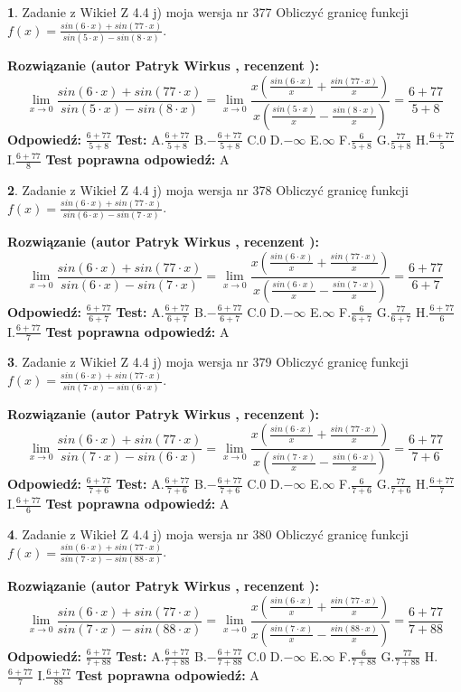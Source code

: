 \documentclass[12pt, a4paper]{article}
\theoremstyle{definition} %
\newtheorem{zad}{}
\newcommand{\zadStart}[1]{\begin{zad}#1\newline}
\newcommand{\zadStop}{\end{zad}}
\newcommand{\rozwStart}[2]{\noindent \textbf{Rozwiązanie (autor #1 , recenzent #2): }\newline}
\newcommand{\rozwStop}{\newline}
\newcommand{\odpStart}{\noindent \textbf{Odpowiedź:}\newline}
\newcommand{\odpStop}{\newline}
\newcommand{\testStart}{\noindent \textbf{Test:}\newline}
\newcommand{\testStop}{\newline}
\newcommand{\kluczStart}{\noindent \textbf{Test poprawna odpowiedź:}\newline}
\newcommand{\kluczStop}{\newline}
\begin{document}
\zadStart{Zadanie z Wikieł Z 4.4 j) moja wersja nr 377}
Obliczyć granicę funkcji $f(x)=\frac{sin(6\cdot x) +sin(77\cdot x)}{sin(5\cdot x) -sin(8\cdot x)}$.
\zadStop
\rozwStart{Patryk Wirkus}{}
$$\lim\limits_{x\to 0}\frac{sin(6\cdot x) +sin(77\cdot x)}{sin(5\cdot x) -sin(8\cdot x)}=\lim\limits_{x\to 0}\frac{x(\frac{sin(6\cdot x)}{x}+\frac{sin(77\cdot x)}{x})}{x(\frac{sin(5\cdot x)}{x}-\frac{sin(8\cdot x)}{x})}=\frac{6+77}{5+8}$$
\rozwStop
\odpStart
$\frac{6+77}{5+8}$
\odpStop
\testStart
A.$\frac{6+77}{5+8}$
B.$-\frac{6+77}{5+8}$
C.$0$
D.$-\infty$
E.$\infty$
F.$\frac{6}{5+8}$
G.$\frac{77}{5+8}$
H.$\frac{6+77}{5}$
I.$\frac{6+77}{8}$
\testStop
\kluczStart
A
\kluczStop



\zadStart{Zadanie z Wikieł Z 4.4 j) moja wersja nr 378}
Obliczyć granicę funkcji $f(x)=\frac{sin(6\cdot x) +sin(77\cdot x)}{sin(6\cdot x) -sin(7\cdot x)}$.
\zadStop
\rozwStart{Patryk Wirkus}{}
$$\lim\limits_{x\to 0}\frac{sin(6\cdot x) +sin(77\cdot x)}{sin(6\cdot x) -sin(7\cdot x)}=\lim\limits_{x\to 0}\frac{x(\frac{sin(6\cdot x)}{x}+\frac{sin(77\cdot x)}{x})}{x(\frac{sin(6\cdot x)}{x}-\frac{sin(7\cdot x)}{x})}=\frac{6+77}{6+7}$$
\rozwStop
\odpStart
$\frac{6+77}{6+7}$
\odpStop
\testStart
A.$\frac{6+77}{6+7}$
B.$-\frac{6+77}{6+7}$
C.$0$
D.$-\infty$
E.$\infty$
F.$\frac{6}{6+7}$
G.$\frac{77}{6+7}$
H.$\frac{6+77}{6}$
I.$\frac{6+77}{7}$
\testStop
\kluczStart
A
\kluczStop



\zadStart{Zadanie z Wikieł Z 4.4 j) moja wersja nr 379}
Obliczyć granicę funkcji $f(x)=\frac{sin(6\cdot x) +sin(77\cdot x)}{sin(7\cdot x) -sin(6\cdot x)}$.
\zadStop
\rozwStart{Patryk Wirkus}{}
$$\lim\limits_{x\to 0}\frac{sin(6\cdot x) +sin(77\cdot x)}{sin(7\cdot x) -sin(6\cdot x)}=\lim\limits_{x\to 0}\frac{x(\frac{sin(6\cdot x)}{x}+\frac{sin(77\cdot x)}{x})}{x(\frac{sin(7\cdot x)}{x}-\frac{sin(6\cdot x)}{x})}=\frac{6+77}{7+6}$$
\rozwStop
\odpStart
$\frac{6+77}{7+6}$
\odpStop
\testStart
A.$\frac{6+77}{7+6}$
B.$-\frac{6+77}{7+6}$
C.$0$
D.$-\infty$
E.$\infty$
F.$\frac{6}{7+6}$
G.$\frac{77}{7+6}$
H.$\frac{6+77}{7}$
I.$\frac{6+77}{6}$
\testStop
\kluczStart
A
\kluczStop



\zadStart{Zadanie z Wikieł Z 4.4 j) moja wersja nr 380}
Obliczyć granicę funkcji $f(x)=\frac{sin(6\cdot x) +sin(77\cdot x)}{sin(7\cdot x) -sin(88\cdot x)}$.
\zadStop
\rozwStart{Patryk Wirkus}{}
$$\lim\limits_{x\to 0}\frac{sin(6\cdot x) +sin(77\cdot x)}{sin(7\cdot x) -sin(88\cdot x)}=\lim\limits_{x\to 0}\frac{x(\frac{sin(6\cdot x)}{x}+\frac{sin(77\cdot x)}{x})}{x(\frac{sin(7\cdot x)}{x}-\frac{sin(88\cdot x)}{x})}=\frac{6+77}{7+88}$$
\rozwStop
\odpStart
$\frac{6+77}{7+88}$
\odpStop
\testStart
A.$\frac{6+77}{7+88}$
B.$-\frac{6+77}{7+88}$
C.$0$
D.$-\infty$
E.$\infty$
F.$\frac{6}{7+88}$
G.$\frac{77}{7+88}$
H.$\frac{6+77}{7}$
I.$\frac{6+77}{88}$
\testStop
\kluczStart
A
\kluczStop
\end{document}
